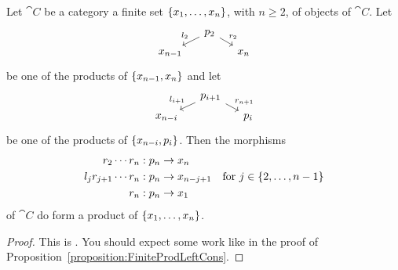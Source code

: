 \begin{proposition}\label{proposition:FiniteProdRightCons}
Let \(\cat C\) be a category a finite set \(\left\{x_1, \dots{}, x_n\right\}\), with \(n \ge 2\), of objects of \(\cat C\). Let
\[\begin{tikzcd}[row sep=tiny, column sep=small]
& p_2 \ar["{l_2}", dl, swap] \ar["{r_2}", dr] \\
x_{n-1} & & x_n
\end{tikzcd}\]
be one of the products of \(\left\{x_{n-1}, x_n\right\}\) and let
\[\begin{tikzcd}[row sep=tiny, column sep=small]
& p_{i+1} \ar["{l_{i+1}}", dl, swap] \ar["{r_{n+1}}", dr] \\
x_{n-i} & & p_i
\end{tikzcd}\]
be one of the products of \(\left\{x_{n-i}, p_i\right\}\).
%
%
Then the morphisms
\[\begin{aligned}
r_2 \cdots{} r_n &: p_n \to x_n \\
l_j r_{j+1} \cdots{} r_n &: p_n \to x_{n-j+1} \quad \text{for } j \in \left\{2, \dots{}, n-1\right\} \\
r_n &: p_n \to x_1
\end{aligned}\]
of \(\cat C\) do form a product of \(\left\{x_1, \dots{}, x_n\right\}\).
\end{proposition}

\begin{proof}
This is . You should expect some work like in the proof of Proposition~\ref{proposition:FiniteProdLeftCons}.
\end{proof}

